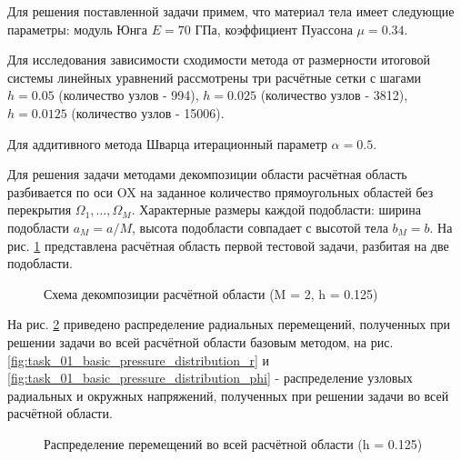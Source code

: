 \documentclass[a4paper, 14pt]{extarticle}
\newcommand{\area}{rectangle}
\newcommand{\task}{3_fixes}
\newcommand{\taskNum}{01}
\begin{document}
Для решения поставленной задачи примем, что материал тела имеет следующие параметры: модуль Юнга $E = 70$ ГПа, коэффициент Пуассона $\mu = 0.34$. 

Для исследования зависимости сходимости метода от размерности итоговой системы линейных уравнений рассмотрены три расчётные сетки с шагами $h = 0.05$ (количество узлов - 994), $h = 0.025$ (количество узлов - 3812), $h = 0.0125$ (количество узлов - 15006).

Для аддитивного метода Шварца итерационный параметр $\alpha = 0.5$.

\newpage

Для решения задачи методами декомпозиции области расчётная область разбивается по оси OX на заданное количество прямоугольных областей без перекрытия $\Omega_1, \ldots, \Omega_M$. Характерные размеры каждой подобласти: ширина подобласти $a_M = a / M$, высота подобласти совпадает с высотой тела $b_M = b$. На рис. \ref{fig:task_\taskNum_decomposition} представлена расчётная область первой тестовой задачи, разбитая на две подобласти.

\begin{figure}[h]
\caption{Схема декомпозиции расчётной области (M = 2, h = 0.125)}
\label{fig:task_\taskNum_decomposition}
\end{figure}

\newpage

На рис. \ref{fig:task_\taskNum_basic_displacement_distribution} приведено распределение радиальных перемещений, полученных при решении задачи во всей расчётной области базовым методом, на рис. \ref{fig:task_\taskNum_basic_pressure_distribution_r} и \ref{fig:task_\taskNum_basic_pressure_distribution_phi} - распределение узловых радиальных и окружных напряжений, полученных при решении задачи во всей расчётной области.

\begin{figure}[h]
\caption{Распределение перемещений во всей расчётной области (h = 0.125)}
\label{fig:task_\taskNum_basic_displacement_distribution}
\end{figure}

\newpage
\end{document}
